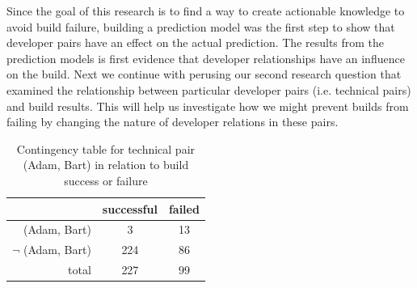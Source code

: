 \documentclass[12pt,oneside]{book}
\begin{document}
Since the goal of this research is to find a way to create actionable knowledge
to avoid build failure, building a prediction model was the first step to show
that developer pairs have an effect on the actual prediction. The results from
the prediction models is first evidence that developer relationships have an
influence on the build. Next we continue with perusing our second research
question that examined the relationship between particular developer
pairs (i.e. technical pairs) and build results. This will help us
investigate how we might prevent builds from failing by changing the
nature of developer relations in these pairs.





\begin{table}[t]
\centering%
\begin{tabular}{rcc}
\toprule
 & successful & failed  \\
 \midrule
(Adam, Bart) & 3 & 13 \\
$\neg$ (Adam, Bart) & 224 & 86\\
\midrule
total&227&99\\\bottomrule
\end{tabular}
\caption{Contingency table for technical pair (Adam, Bart) in relation to build
success or failure}
\label{tab:contingencytable}
\end{table}
\end{document}
